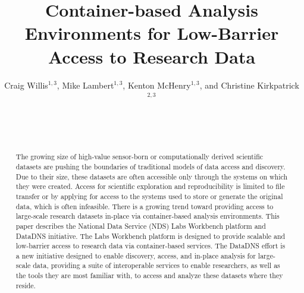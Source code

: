 \documentclass{sig-alternate}
\begin{document}
\sloppy
{}

\author{
Craig Willis$^{1,3}$, Mike Lambert$^{1,3}$, Kenton McHenry$^{1,3}$, and Christine Kirkpatrick$^{2,3}$\\
     \\     
     \\     
     \\     
}

\title{Container-based Analysis Environments for Low-Barrier Access to Research Data}

\maketitle
\begin{abstract}

The growing size of high-value sensor-born or computationally derived scientific datasets are pushing the boundaries of traditional models of data access and discovery. Due to their size, these datasets are often accessible only through the systems on which they were created. Access for scientific exploration and reproducibility is limited to file transfer or by applying for access to the systems used to store or generate the original data, which is often infeasible. There is a growing trend toward providing access to large-scale research datasets in-place via container-based analysis environments. This paper describes the National Data Service (NDS) Labs Workbench platform and DataDNS initiative. The Labs Workbench platform is designed to provide scalable and low-barrier access to research data via container-based services. The DataDNS effort is a new initiative designed to enable discovery, access, and in-place analysis for large-scale data, providing a suite of interoperable services to enable researchers, as well as the tools they are most familiar with, to access and analyze these datasets where they reside.

\end{abstract}


\end{document}

